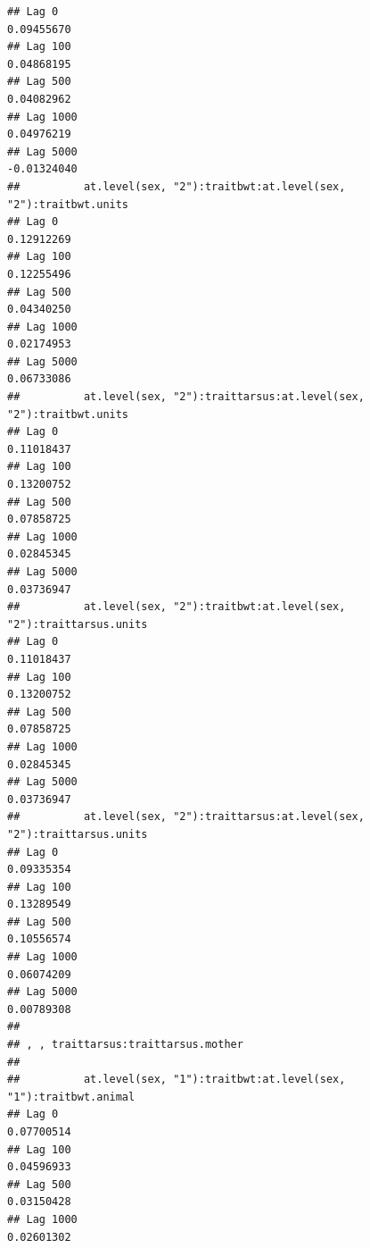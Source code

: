 \documentclass[
  12pt,
]{book}
\begin{document}
\begin{verbatim}
## Lag 0                                                             0.09455670
## Lag 100                                                           0.04868195
## Lag 500                                                           0.04082962
## Lag 1000                                                          0.04976219
## Lag 5000                                                         -0.01324040
##          at.level(sex, "2"):traitbwt:at.level(sex, "2"):traitbwt.units
## Lag 0                                                       0.12912269
## Lag 100                                                     0.12255496
## Lag 500                                                     0.04340250
## Lag 1000                                                    0.02174953
## Lag 5000                                                    0.06733086
##          at.level(sex, "2"):traittarsus:at.level(sex, "2"):traitbwt.units
## Lag 0                                                          0.11018437
## Lag 100                                                        0.13200752
## Lag 500                                                        0.07858725
## Lag 1000                                                       0.02845345
## Lag 5000                                                       0.03736947
##          at.level(sex, "2"):traitbwt:at.level(sex, "2"):traittarsus.units
## Lag 0                                                          0.11018437
## Lag 100                                                        0.13200752
## Lag 500                                                        0.07858725
## Lag 1000                                                       0.02845345
## Lag 5000                                                       0.03736947
##          at.level(sex, "2"):traittarsus:at.level(sex, "2"):traittarsus.units
## Lag 0                                                             0.09335354
## Lag 100                                                           0.13289549
## Lag 500                                                           0.10556574
## Lag 1000                                                          0.06074209
## Lag 5000                                                          0.00789308
## 
## , , traittarsus:traittarsus.mother
## 
##          at.level(sex, "1"):traitbwt:at.level(sex, "1"):traitbwt.animal
## Lag 0                                                        0.07700514
## Lag 100                                                      0.04596933
## Lag 500                                                      0.03150428
## Lag 1000                                                     0.02601302

\end{verbatim}
\end{document}

